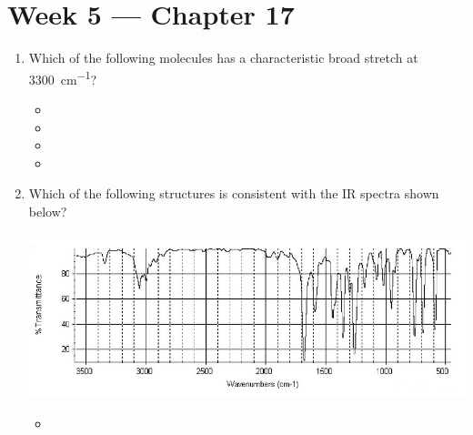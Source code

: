 \documentclass[quiz]{inVerba-notes}
\begin{document}
\hypertarget{ToC}{\tableofcontents}

\clearpage
\section{Week 5 --- Chapter 17}\label{Week-5}
\begin{enumerate}
  \item Which of the following molecules has a characteristic broad stretch at \SI{3300}{cm^{-1}}?
    \begin{itemize}
      \item {}
      \item {}
      \item {}
      \item {}
    \end{itemize}
  \item Which of the following structures is consistent with the IR spectra shown below?
  
  \begin{center}
    \includegraphics[scale=0.48]{images/quiz-4.png}
  \end{center}
  \medskip
  \begin{itemize}
    \item {\footnotesize{}}
  \end{itemize}
  \bigskip


\end{enumerate}
\end{document}
